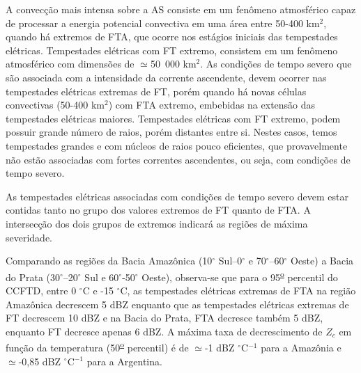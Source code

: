 
A convecção mais intensa sobre a AS consiste em um fenômeno atmosférico capaz de processar a energia potencial convectiva em uma área entre 50-400 km$^{2}$, quando há extremos de FTA, que ocorre nos estágios iniciais das tempestades elétricas. Tempestades elétricas com FT extremo, consistem em um fenômeno  atmosférico com dimensões de $\simeq$50~000 km$^{2}$. As condições de tempo severo que são associada com a intensidade da corrente ascendente, devem ocorrer nas tempestades elétricas extremas de FT, porém quando há novas células convectivas (50-400 km$^{2}$) com FTA extremo, embebidas na extensão das tempestades elétricas maiores. Tempestades elétricas com FT extremo, podem possuir grande número de raios, porém distantes entre si. Nestes casos, temos tempestades grandes e com núcleos de raios pouco eficientes, que provavelmente não estão associadas com fortes correntes ascendentes, ou seja, com condições de tempo severo.


As tempestades elétricas associadas com condições de tempo severo devem estar contidas tanto no grupo dos valores extremos de FT quanto de FTA. A intersecção dos dois grupos de extremos indicará as regiões de máxima severidade. %

Comparando as regiões da Bacia Amazônica (10$^{\circ}$ Sul--0$^{\circ}$ e 70$^{\circ}$--60$^{\circ}$ Oeste) a Bacia do Prata (30$^{\circ}$--20$^{\circ}$ Sul e 60$^{\circ}$-50$^{\circ}$ Oeste), observa-se que para o 95\textsuperscript{\underline{o}} percentil do CCFTD, entre 0 $^{\circ}$C e -15 $^{\circ}$C, as tempestades elétricas extremas de FTA na região Amazônica decrescem 5 dBZ enquanto que as tempestades elétricas extremas de FT decrescem 10 dBZ e na Bacia do Prata, FTA decresce também 5 dBZ, enquanto FT decresce apenas 6 dBZ. A máxima taxa de decrescimento de $Z_c$ em função da temperatura (50\textsuperscript{\underline{o}} percentil) é de $\simeq$-1 dBZ $^{\circ}$C$^{-1}$ para a Amazônia e $\simeq$-0,85 dBZ $^{\circ}$C$^{-1}$ para a Argentina.


